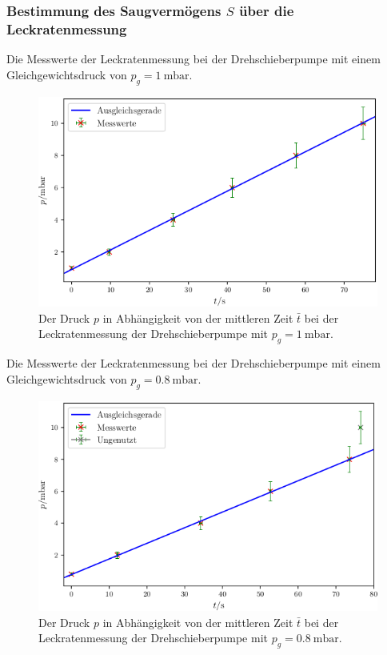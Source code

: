 \subsubsection{Bestimmung des Saugvermögens $S$ über die Leckratenmessung}

\begin{table}
\centering
\caption{Die Messwerte der Leckratenmessung bei der Drehschieberpumpe mit einem Gleichgewichtsdruck von $p_g = \SI{1}{\milli\bar}$.}

\label{tab:DL1}
\end{table}

\begin{figure}
\centering
\includegraphics[width=\linewidth-70pt,height=\textheight-70pt,keepaspectratio]{content/images/DL1.png}
\caption{Der Druck $p$ in Abhängigkeit von der mittleren Zeit $\bar{t}$ bei der Leckratenmessung der Drehschieberpumpe  mit $p_g = \SI{1}{\milli\bar}$.}
\label{fig:DL1}
\end{figure}

\begin{table}
\centering
\caption{Die Messwerte der Leckratenmessung bei der Drehschieberpumpe mit einem Gleichgewichtsdruck von $p_g = \SI{0.8}{\milli\bar}$.}

\label{tab:DL2}
\end{table}

\begin{figure}
\centering
\includegraphics[width=\linewidth-70pt,height=\textheight-70pt,keepaspectratio]{content/images/DL2.png}
\caption{Der Druck $p$ in Abhängigkeit von der mittleren Zeit $\bar{t}$ bei der Leckratenmessung der Drehschieberpumpe  mit $p_g = \SI{0.8}{\milli\bar}$.}
\label{fig:DL2}
\end{figure}

